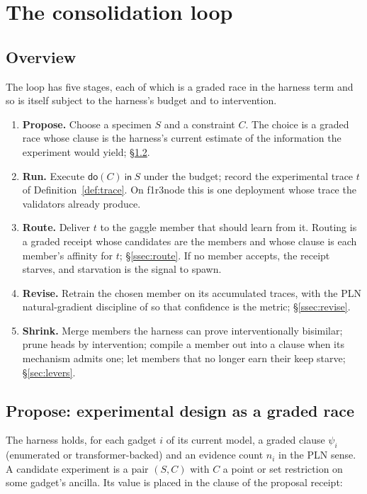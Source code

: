 \documentclass[11pt]{article}
\theoremstyle{plain}
\theoremstyle{definition}
\theoremstyle{remark}
\newcommand{\dok}{\textsf{do}}
\newcommand{\ink}{\textsf{in}}
\begin{document}
\section{The consolidation loop}\label{sec:loop}

\subsection{Overview}

The loop has five stages, each of which is a graded race in the harness term
and so is itself subject to the harness's budget and to intervention.

\begin{enumerate}[leftmargin=1.6em,itemsep=2pt]
\item \textbf{Propose.} Choose a specimen $S$ and a constraint $C$. The choice
is a graded race whose clause is the harness's current estimate of the
information the experiment would yield; \S\ref{ssec:propose}.
\item \textbf{Run.} Execute $\dok(C)\ \ink\ S$ under the budget; record the
experimental trace $t$ of Definition~\ref{def:trace}. On f1r3node this is one
deployment whose trace the validators already produce.
\item \textbf{Route.} Deliver $t$ to the gaggle member that should learn from
it. Routing is a graded receipt whose candidates are the members and whose
clause is each member's affinity for $t$; \S\ref{ssec:route}. If no member
accepts, the receipt starves, and starvation is the signal to spawn.
\item \textbf{Revise.} Retrain the chosen member on its accumulated traces, with
the PLN natural-gradient discipline of \cite{GradedPLN} so that confidence is
the metric; \S\ref{ssec:revise}.
\item \textbf{Shrink.} Merge members the harness can prove interventionally
bisimilar; prune heads by intervention; compile a member out into a clause when
its mechanism admits one; let members that no longer earn their keep starve;
\S\ref{sec:levers}.
\end{enumerate}

\subsection{Propose: experimental design as a graded race}\label{ssec:propose}

The harness holds, for each gadget $i$ of its current model, a graded clause
$\psi_i$ (enumerated or transformer-backed) and an evidence count $n_i$ in the
PLN sense. A candidate experiment is a pair $(S, C)$ with $C$ a point or set
restriction on some gadget's ancilla. Its value is placed in the clause of the
proposal receipt:
\end{document}
